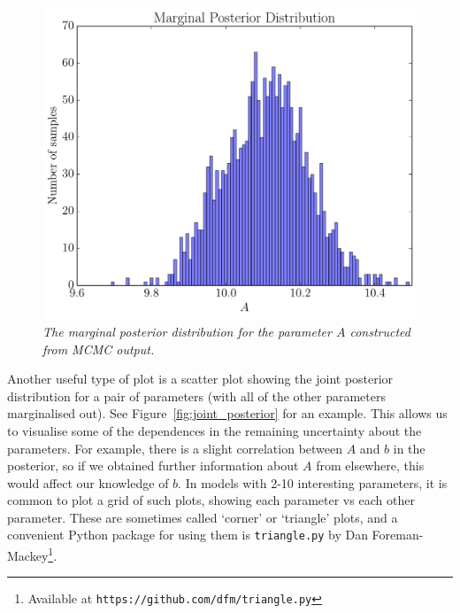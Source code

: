 \begin{figure}
\begin{center}
\includegraphics[scale=0.45]{marginal_posterior.pdf}
\caption{\it The marginal posterior distribution for the parameter $A$ constructed
from MCMC output.\label{fig:marginal_posterior}}
\end{center}
\end{figure}

Another useful type of plot is a scatter plot showing the joint posterior
distribution for a pair of parameters (with all of the other parameters
marginalised out). See Figure~\ref{fig:joint_posterior} for an example.
This allows us to visualise some of the dependences in the remaining
uncertainty about the parameters. For example, there is a slight correlation
between $A$ and $b$ in the posterior, so if we obtained further information
about $A$ from elsewhere, this would affect our knowledge of $b$.
In models with 2-10 interesting parameters, it is common to plot a grid
of such plots, showing each parameter vs each other parameter. These are
sometimes called `corner' or `triangle' plots, and a convenient Python package
for using them is {\tt triangle.py} by Dan
Foreman-Mackey\footnote{Available at
{\tt https://github.com/dfm/triangle.py}}.

